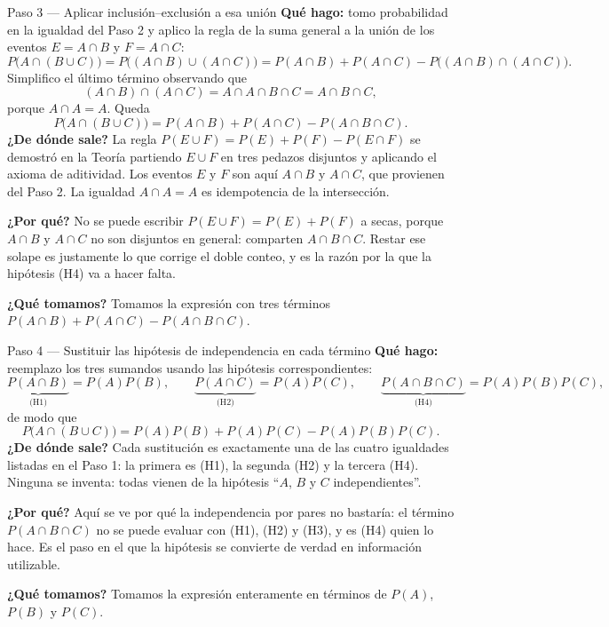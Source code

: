 \documentclass[11pt]{article}
\begin{document}
\begin{sol}
\begin{paso}{Paso 3 --- Aplicar inclusión--exclusión a esa unión}
\textbf{Qué hago:} tomo probabilidad en la igualdad del Paso 2 y aplico la regla de la suma
general a la unión de los eventos $E=A\cap B$ y $F=A\cap C$:
\[
P\bigl(A\cap(B\cup C)\bigr)=P\bigl((A\cap B)\cup(A\cap C)\bigr)
=P(A\cap B)+P(A\cap C)-P\bigl((A\cap B)\cap(A\cap C)\bigr).
\]
Simplifico el último término observando que
\[
(A\cap B)\cap(A\cap C)=A\cap A\cap B\cap C=A\cap B\cap C,
\]
porque $A\cap A=A$. Queda
\[
P\bigl(A\cap(B\cup C)\bigr)=P(A\cap B)+P(A\cap C)-P(A\cap B\cap C).
\]
\textbf{¿De dónde sale?} La regla $P(E\cup F)=P(E)+P(F)-P(E\cap F)$ se demostró en la Teoría
partiendo $E\cup F$ en tres pedazos disjuntos y aplicando el axioma de aditividad. Los
eventos $E$ y $F$ son aquí $A\cap B$ y $A\cap C$, que provienen del Paso 2. La igualdad
$A\cap A=A$ es idempotencia de la intersección.

\textbf{¿Por qué?} No se puede escribir $P(E\cup F)=P(E)+P(F)$ a secas, porque $A\cap B$ y
$A\cap C$ no son disjuntos en general: comparten $A\cap B\cap C$. Restar ese solape es
justamente lo que corrige el doble conteo, y es la razón por la que la hipótesis (H4) va a
hacer falta.

\textbf{¿Qué tomamos?} Tomamos la expresión con tres términos
$P(A\cap B)+P(A\cap C)-P(A\cap B\cap C)$.
\end{paso}

\begin{paso}{Paso 4 --- Sustituir las hipótesis de independencia en cada término}
\textbf{Qué hago:} reemplazo los tres sumandos usando las hipótesis correspondientes:
\[
\underbrace{P(A\cap B)}_{\text{(H1)}}=P(A)P(B),\qquad
\underbrace{P(A\cap C)}_{\text{(H2)}}=P(A)P(C),\qquad
\underbrace{P(A\cap B\cap C)}_{\text{(H4)}}=P(A)P(B)P(C),
\]
de modo que
\[
P\bigl(A\cap(B\cup C)\bigr)=P(A)P(B)+P(A)P(C)-P(A)P(B)P(C).
\]
\textbf{¿De dónde sale?} Cada sustitución es exactamente una de las cuatro igualdades
listadas en el Paso 1: la primera es (H1), la segunda (H2) y la tercera (H4). Ninguna se
inventa: todas vienen de la hipótesis ``$A$, $B$ y $C$ independientes''.

\textbf{¿Por qué?} Aquí se ve por qué la independencia por pares no bastaría: el término
$P(A\cap B\cap C)$ no se puede evaluar con (H1), (H2) y (H3), y es (H4) quien lo hace. Es el
paso en el que la hipótesis se convierte de verdad en información utilizable.

\textbf{¿Qué tomamos?} Tomamos la expresión enteramente en términos de $P(A)$, $P(B)$ y
$P(C)$.
\end{paso}


\end{sol}
\end{document}

